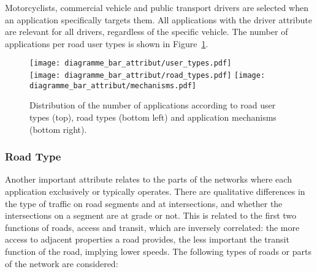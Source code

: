 Motorcyclists, commercial vehicle and public transport drivers are selected when an application specifically targets them. All applications with the driver attribute are relevant for all drivers, regardless of the specific vehicle. 
The number of applications per road user types is shown in Figure~\ref{fig:nb-app-attribut}. 

\begin{figure}[ht!]
  \begin{center}
    \texttt{[image: diagramme\_bar\_attribut/user\_types.pdf]}\\
    \texttt{[image: diagramme\_bar\_attribut/road\_types.pdf]}
    \texttt{[image: diagramme\_bar\_attribut/mechanisms.pdf]}
    \caption{Distribution of the number of applications according to road user types (top), road types (bottom left) and application mechanisms (bottom right).}
    \label{fig:nb-app-attribut}
  \end{center}
\end{figure}


\subsubsection{Road Type}
Another important attribute relates to the parts of the networks where each application exclusively or typically operates. There are qualitative differences in the type of traffic on road segments and at intersections, and whether the intersections on a segment are at grade or not. This is related to the first two functions of roads, access and transit, which are inversely correlated: the more access to adjacent properties a road provides, the less important the transit function of the road, implying lower speeds. 
The following types of roads or parts of the network are considered:



